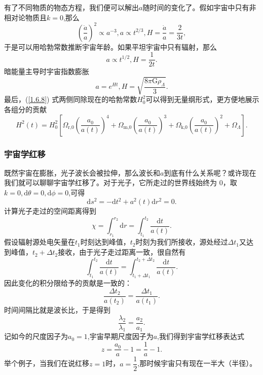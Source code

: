 \documentclass[../天体物理基础.tex]{subfiles}
\begin{document}
有了不同物质的物态方程，我们便可以解出$a$随时间的变化了。假如宇宙中只有非相对论物质且$k=0$,那么
\begin{equation}
\left(\frac{\dot{a}}{a}\right)^{2}\propto{}a^{-3},a\propto{}t^{2/3},H=\frac{\dot{a}}{a}=\frac{2}{3t},
\end{equation}
于是可以用哈勃常数推断宇宙年龄。如果平坦宇宙中只有辐射，那么
\begin{equation}
a\propto{}t^{1/2},H=\frac{1}{2t}.
\end{equation}
暗能量主导时宇宙指数膨胀
\begin{equation}
a=e^{Ht},H=\sqrt{\frac{8\pi\mathrm{G}\rho_{\Lambda}}{3}}.
\end{equation}
最后，(\ref{1.6.8}) 式两侧同除现在的哈勃常数$H_{0}^{2}$可以得到无量纲形式，更方便地展示各组分的贡献
\begin{equation}
H^{2}\left(t\right)=H_{0}^{2}\left[\Omega_{\text{r,0}}\left(\frac{a_{0}}{a\left(t\right)}\right)^{4}+\Omega_{\text{m,0}}\left(\frac{a_{0}}{a\left(t\right)}\right)^{3}+\Omega_{\text{k,0}}\left(\frac{a_{0}}{a\left(t\right)}\right)^{2}+\Omega_{\Lambda}\right].
\end{equation}

\subsubsection{宇宙学红移}
既然宇宙在膨胀，光子波长会被拉伸，那么波长和$a$到底有什么关系呢？或许现在我们就可以聊聊宇宙学红移了。对于光子，它所走过的世界线始终为 0，取$k=0,\mathrm{d}\theta=0,\mathrm{d}\phi=0$,可得
\begin{equation}
\mathrm{d}s^{2}=-\mathrm{d}t^{2}+a^{2}\left(t\right)\mathrm{d}r^{2}=0.
\end{equation}
计算光子走过的空间距离得到
\begin{equation}
\chi=\int_{r_{1}}^{r_{2}}\mathrm{d}r=\int_{t_{1}}^{t_{2}}\frac{\mathrm{d}t}{a\left(t\right)}.
\end{equation}
假设辐射源处电矢量在$t_{1}$时刻达到峰值，$t_{2}$时刻为我们所接收，源处经过$\Delta{}t_{1}$又达到峰值，$t_{2}+\Delta{}t_{2}$接收，由于光子走过距离一致，很自然有
\begin{equation}
\int_{t_{1}}^{t_{2}}\frac{\mathrm{d}t}{a\left(t\right)}=\int_{t_{1}+\Delta{}t_{1}}^{t_{2}+\Delta{}t_{2}}\frac{\mathrm{d}t}{a\left(t\right)}.
\end{equation}
因此变化的积分限给予的贡献是一致的：
\begin{equation}
\frac{\Delta{}t_{2}}{a\left(t_{2}\right)}=\frac{\Delta{}t_{1}}{a\left(t_{1}\right)}.
\end{equation}
时间间隔比就是波长比，于是得到
\begin{equation}
\frac{\lambda_{2}}{\lambda_{1}}=\frac{a_{2}}{a_{1}}.
\end{equation}
记如今的尺度因子为$a_{0}=1$,宇宙早期尺度因子为$a$,我们得到宇宙学红移表达式
\begin{equation}
z=\frac{a_{0}}{a}-1=\frac{1}{a}-1.
\end{equation}
举个例子，当我们在说红移$z=1$时，$a=\dfrac12$,那时候宇宙只有现在一半大（半径）。
\end{document}
